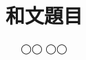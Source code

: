 \documentclass{/workdir/classes/thesis}
\title{和文題目}
\affiliation{東京大学 工学部 精密工学科}
\author{{◯◯ ◯◯}}
\begin{document}
\dominitoc

\maketitle



\frontmatter
\tableofcontents
\listoffigures
\listoftables


\mainmatter









% 

% 

\cleardoublepage
\end{document}
